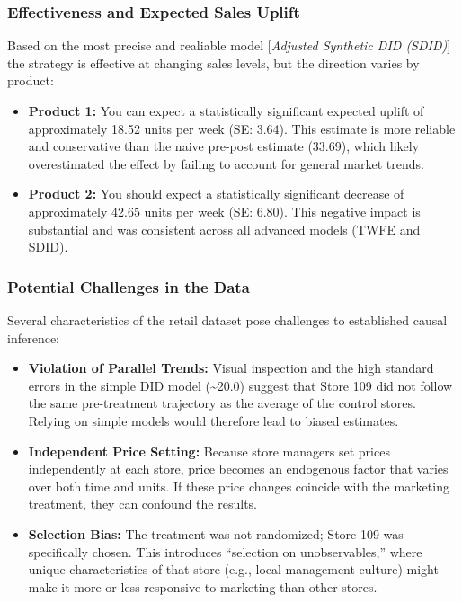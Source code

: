 \documentclass[
  letterpaper,
  DIV=11,
  numbers=noendperiod]{scrartcl}
\providecommand{\tightlist}{%
  \setlength{\itemsep}{0pt}\setlength{\parskip}{0pt}}
\begin{document}
\subsubsection{Effectiveness and Expected Sales
Uplift}\label{effectiveness-and-expected-sales-uplift}

Based on the most precise and realiable model {[}\emph{Adjusted
Synthetic DID (SDID)}{]} the strategy is effective at changing sales
levels, but the direction varies by product:

\begin{itemize}
\tightlist
\item
  \textbf{Product 1:} You can expect a statistically significant
  expected uplift of approximately 18.52 units per week (SE: 3.64). This
  estimate is more reliable and conservative than the naive pre-post
  estimate (33.69), which likely overestimated the effect by failing to
  account for general market trends.
\item
  \textbf{Product 2:} You should expect a statistically significant
  decrease of approximately 42.65 units per week (SE: 6.80). This
  negative impact is substantial and was consistent across all advanced
  models (TWFE and SDID).
\end{itemize}

\subsubsection{Potential Challenges in the
Data}\label{potential-challenges-in-the-data}

Several characteristics of the retail dataset pose challenges to
established causal inference:

\begin{itemize}
\tightlist
\item
  \textbf{Violation of Parallel Trends:} Visual inspection and the high
  standard errors in the simple DID model (\textasciitilde20.0) suggest
  that Store 109 did not follow the same pre-treatment trajectory as the
  average of the control stores. Relying on simple models would
  therefore lead to biased estimates.
\item
  \textbf{Independent Price Setting:} Because store managers set prices
  independently at each store, price becomes an endogenous factor that
  varies over both time and units. If these price changes coincide with
  the marketing treatment, they can confound the results.
\item
  \textbf{Selection Bias:} The treatment was not randomized; Store 109
  was specifically chosen. This introduces ``selection on
  unobservables,'' where unique characteristics of that store (e.g.,
  local management culture) might make it more or less responsive to
  marketing than other stores.
\end{itemize}
\end{document}
